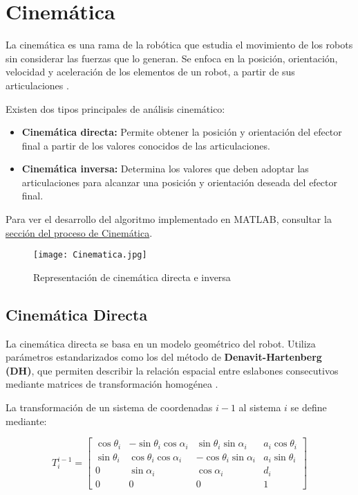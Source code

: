 \section{Cinemática} \label{sec:cinematica}

La cinemática es una rama de la robótica que estudia el movimiento de los robots sin considerar las fuerzas que 
lo generan. Se enfoca en la posición, orientación, 
velocidad y aceleración de los elementos de un robot, a partir de sus articulaciones \cite{Barrientos_fundamentos_robotica}.


Existen dos tipos principales de análisis cinemático:

\begin{itemize}
	\item \textbf{Cinemática directa:} Permite obtener la posición y orientación del efector final a partir de los valores conocidos de las articulaciones.
	\item \textbf{Cinemática inversa:} Determina los valores que deben adoptar las articulaciones para alcanzar una posición y orientación deseada del efector final.
\end{itemize}

Para ver el desarrollo del algoritmo implementado en MATLAB, consultar la \hyperref[sec:proceso_cinematica]{sección del proceso de Cinemática}.



\begin{figure}[h]
	\centering
	\texttt{[image: Cinematica.jpg]}
	\caption{Representación de cinemática directa e inversa \cite{Barrientos_fundamentos_robotica}}
	\label{fig:cinematica-dir-inv}
\end{figure}
\pagebreak[4]  

\subsection{Cinemática Directa}

La cinemática directa se basa en un modelo geométrico del robot. Utiliza parámetros estandarizados como los del método de \textbf{Denavit-Hartenberg (DH)}, que permiten describir la relación espacial entre eslabones consecutivos mediante matrices de transformación homogénea \cite{saha2010}.

La transformación de un sistema de coordenadas \(i-1\) al sistema \(i\) se define mediante:

\[
T_i^{i-1} =
\begin{bmatrix}
	\cos\theta_i & -\sin\theta_i \cos\alpha_i & \sin\theta_i \sin\alpha_i & a_i \cos\theta_i \\
	\sin\theta_i & \cos\theta_i \cos\alpha_i & -\cos\theta_i \sin\alpha_i & a_i \sin\theta_i \\
	0 & \sin\alpha_i & \cos\alpha_i & d_i \\
	0 & 0 & 0 & 1
\end{bmatrix}
\]

